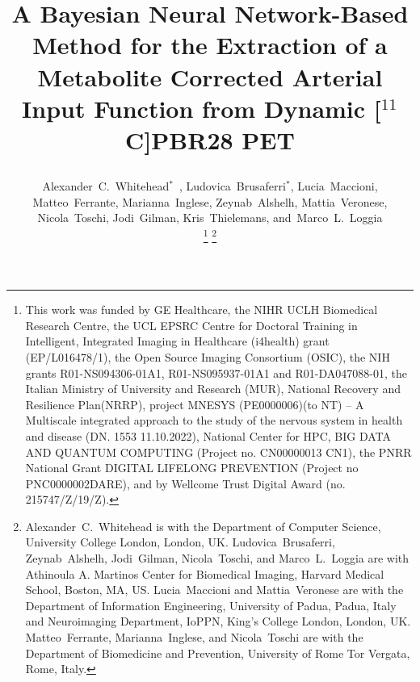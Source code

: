 \documentclass{IEEEtran}
\begin{document}
    \title{
        \vspace{-0.75cm}
        
        A Bayesian Neural Network-Based Method for the Extraction of a Metabolite Corrected Arterial Input Function from Dynamic [$^{11}$C]PBR28 PET 
    }
    
    \author{
        \vspace{-0.25cm}
        
        Alexander~C.~Whitehead$^{*}$~,
        Ludovica~Brusaferri$^{*}$,
        Lucia~Maccioni,
        Matteo~Ferrante,
        Marianna~Inglese,
        Zeynab~Alshelh,
        Mattia~Veronese,
        Nicola~Toschi,
        Jodi~Gilman,
        Kris~Thielemans,
        and~Marco~L.~Loggia
    
        \vspace{-0.75cm}
    
        \thanks{
            \scriptsize
            This work was funded by GE Healthcare, the NIHR UCLH Biomedical Research Centre, the UCL EPSRC Centre for Doctoral Training in Intelligent, Integrated Imaging in Healthcare (i4health) grant (EP/L016478/1), the Open Source Imaging Consortium (OSIC), the NIH grants R01-NS094306-01A1, R01-NS095937-01A1 and R01-DA047088-01, the Italian Ministry of University and Research (MUR), National Recovery and Resilience Plan(NRRP), project MNESYS (PE0000006)(to NT) – A Multiscale integrated approach to the study of the nervous system in health and disease (DN. 1553 11.10.2022), National Center for HPC, BIG DATA AND QUANTUM COMPUTING (Project no. CN00000013 CN1), the PNRR National Grant DIGITAL LIFELONG PREVENTION (Project no PNC0000002DARE), and by Wellcome Trust Digital Award (no. 215747/Z/19/Z).
        }
        \thanks{
            \scriptsize
            Alexander~C.~Whitehead is with the Department of Computer Science, University College London, London, UK. Ludovica~Brusaferri, Zeynab~Alshelh, Jodi~Gilman, Nicola~Toschi, and Marco~L.~Loggia are with Athinoula A. Martinos Center for Biomedical Imaging, Harvard Medical School, Boston, MA, US. Lucia~Maccioni and Mattia~Veronese are with the Department of Information Engineering, University of Padua, Padua, Italy and Neuroimaging Department, IoPPN, King’s College London, London, UK. Matteo~Ferrante, Marianna~Inglese, and Nicola~Toschi are with the Department of Biomedicine and Prevention, University of Rome Tor Vergata, Rome, Italy.
        }
    }
    
    \pagestyle{plain}
    
\end{document}
